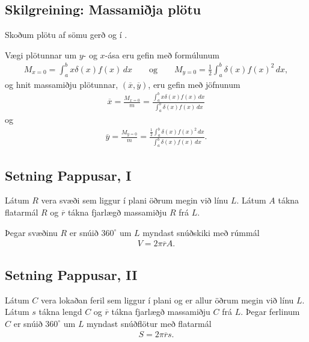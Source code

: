 \documentclass[b5paper,11pt,icelandic]{sphinxmanual}
\begin{document}
\subsection{Skilgreining: Massamiðja plötu}
\label{kafli07:index-14}\label{kafli07:skilgreining-massamija-plotu}
Skoðum plötu af sömu gerð og í {\hyperref[kafli07:massi\string-plotu]{}}.

Vægi plötunnar um \(y\)- og \(x\)-ása eru gefin með formúlunum
\begin{equation*}
\begin{split}M_{x=0}=\int_a^b x\delta(x)f(x)\,dx
\qquad\mbox{og}\qquad
M_{y=0}=\frac{1}{2}\int_a^b \delta(x)f(x)^2\,dx,\end{split}
\end{equation*}
og hnit massamiðju plötunnar, \((\overline{x}, \overline{y})\), eru
gefin með jöfnunum
\begin{equation*}
\begin{split}\overline{x}=\frac{M_{x=0}}{m}=
\frac{\int_a^b x\delta(x)f(x)\,dx}{\int_a^b \delta(x)f(x)\,dx}\end{split}
\end{equation*}
og
\begin{equation*}
\begin{split}\overline{y}=\frac{M_{y=0}}{m}=
\frac{\frac{1}{2}\int_a^b \delta(x)f(x)^2\,dx}{\int_a^b
\delta(x)f(x)\,dx}.\end{split}
\end{equation*}

\subsection{Setning Pappusar, I}
\label{kafli07:setning-pappusar-i}\label{kafli07:index-15}
Látum \(R\) vera svæði sem liggur í plani öðrum megin við línu
\(L\). Látum \(A\) tákna flatarmál \(R\) og
\(\overline{r}\) tákna fjarlægð massamiðju \(R\) frá \(L\).

Þegar svæðinu \(R\) er snúið \(360^\circ\) um \(L\) myndast
snúðskiki með rúmmál
\begin{equation*}
\begin{split}V=2\pi\overline{r}A.\end{split}
\end{equation*}

\subsection{Setning Pappusar, II}
\label{kafli07:setning-pappusar-ii}
Látum \(C\) vera lokaðan feril sem liggur í plani og er allur öðrum
megin við línu \(L\). Látum \(s\) tákna lengd \(C\) og
\(\overline{r}\) tákna fjarlægð massamiðju \(C\) frá \(L\).
Þegar ferlinum \(C\) er snúið \(360^\circ\) um \(L\) myndast
snúðflötur með flatarmál
\begin{equation*}
\begin{split}S=2\pi\overline{r}s.\end{split}
\end{equation*}
\end{document}
